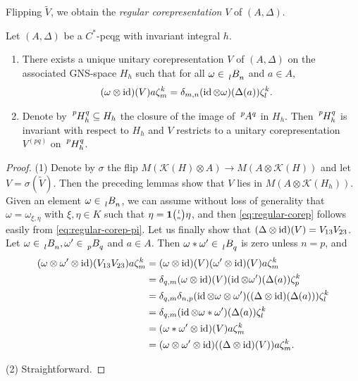 Flipping $\tilde V$, we obtain the \emph{regular corepresentation} $V$ of $(A,\Delta)$.
 \begin{Prop}
Let $(A,\Delta)$ be a $C^{*}$-pcqg with invariant integral $h$.
\begin{enumerate}
\item  There exists a unique unitary corepresentation $V$ of  $(A,\Delta)$ on the associated GNS-space $H_{h}$ such that  for all
$\omega \in \Grd{B}{l}{n}$ and $a \in A$,
  \begin{align} \label{eq:regular-corep}
    (\omega \otimes \operatorname{id})(V) a\zeta^{k}_{m} &= \delta_{m,n} (\operatorname{id} \otimes \omega)(\Delta(a)) \zeta^{k}_{l}.
  \end{align}
\item Denote by $\Gr{H}{p}{q}{}{h}
  \subseteq H_{h}$ the closure of the image of  $\Gr{A}{p}{q}{}{}$ in $H_{h}$. Then  $\Gr{H}{p}{q}{}{h}$ is invariant with  respect to $H_{h}$ and $V$ restricts to a unitary corepresentation $V^{(pq)}$ on $\Gr{H}{p}{q}{}{h}$.
\end{enumerate}
 \end{Prop}
 \begin{proof}
(1)   Denote by $\sigma$ the flip $ M(\mathcal{K}(H) \otimes A) \to M(A
   \otimes \mathcal{K}(H))$ and let $V=\sigma(\tilde V)$. Then the   preceding lemmas show that $V$ lies in $M(A\otimes
   \mathcal{K}(H_{h}))$. Given an element $\omega \in \Grd{B}{l}{n}$, we can assume without loss of generality that $\omega=\omega_{\xi,\eta}$ with $\xi,\eta\in K$ such that $\eta=\mathbf{1}{\tiny {\begin{pmatrix} l\\n\end{pmatrix}}}\eta$, and then \eqref{eq:regular-corep} follows easily from \eqref{eq:regular-corep-pi}. Let us finally show that $(\Delta \otimes \operatorname{id})(V)=V_{13}V_{23}$. Let $\omega \in \Grd{B}{l}{n}, \omega' \in \Grd{B}{p}{q}$ and $a\in A$. Then
$\omega \ast\omega' \in \Grd{B}{l}{q}$ is zero unless $n=p$, and
   \begin{align*}
     (\omega \otimes \omega' \otimes \operatorname{id})(V_{13}V_{23})a\zeta^{k}_{m} &= (\omega \otimes \operatorname{id})(V)(\omega' \otimes \operatorname{id})(V) a\zeta^{k}_{m}\\
     &= \delta_{q,m} (\omega \otimes \operatorname{id})(V)(\operatorname{id} \otimes \omega')(\Delta(a))\zeta^{k}_{p} \\
     &= \delta_{q,m}\delta_{n,p}  (\operatorname{id} \otimes \omega \otimes \omega')((\Delta\otimes \operatorname{id})(\Delta(a)))\zeta^{k}_{l} \\
     &= \delta_{q,m} (\operatorname{id} \otimes \omega \ast \omega')(\Delta(a))\zeta^{k}_{l} \\
     &= (\omega\ast\omega' \otimes \operatorname{id})(V)a\zeta^{k}_{m} \\
     &= (\omega \otimes \omega' \otimes \operatorname{id})((\Delta \otimes \operatorname{id})(V))a\zeta^{k}_{m}.
   \end{align*}

(2) Straightforward.
 \end{proof}

